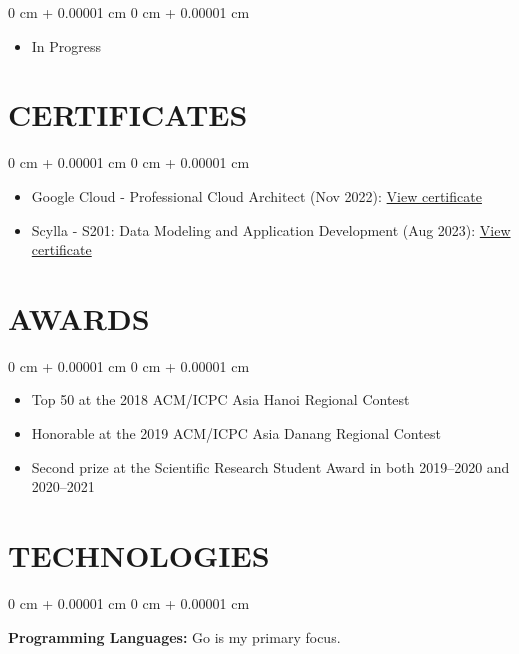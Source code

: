 \documentclass[10pt, letterpaper]{article}
\newenvironment{highlights}{
    \begin{itemize}[
        topsep=0.10 cm,
        parsep=0.10 cm,
        partopsep=0pt,
        itemsep=0pt,
        leftmargin=0 cm + 10pt
    ]
}{
    \end{itemize}
} %
\newenvironment{onecolentry}{
    \begin{adjustwidth}{
        0 cm + 0.00001 cm
    }{
        0 cm + 0.00001 cm
    }
}{
    \end{adjustwidth}
} %
\begin{document}
    \vspace{0.10 cm}
    \begin{onecolentry}
        \begin{highlights}
            \item In Progress
        \end{highlights}
    \end{onecolentry}

    \section{CERTIFICATES}

    \begin{onecolentry}
        \begin{highlights}
            \item Google Cloud - Professional Cloud Architect (Nov 2022): \href{https://google.com/certificates}{View certificate}
            \item Scylla - S201: Data Modeling and Application Development (Aug 2023): \href{https://scylla.com/certificates}{View certificate}
        \end{highlights}
    \end{onecolentry}

    \section{AWARDS}

    \begin{onecolentry}
        \begin{highlights}
            \item Top 50 at the 2018 ACM/ICPC Asia Hanoi Regional Contest
            \item Honorable at the 2019 ACM/ICPC Asia Danang Regional Contest
            \item Second prize at the Scientific Research Student Award in both 2019–2020 and 2020–2021
        \end{highlights}
    \end{onecolentry}

    \section{TECHNOLOGIES}

    \begin{onecolentry}
        \textbf{Programming Languages:} Go is my primary focus.
    \end{onecolentry}
\end{document}
